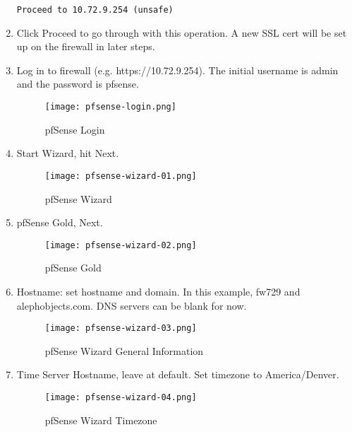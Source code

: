 \begin{enumerate}
\begin{verbatim}
Proceed to 10.72.9.254 (unsafe)
\end{verbatim}

 \item Click Proceed to go through with this operation. A new SSL cert will be set up on the firewall in later steps.

 \item Log in to firewall (e.g. https://10.72.9.254). The initial username is admin and the password is pfsense.

\begin{figure}[h!]
\begin{center}
\texttt{[image: pfsense-login.png]}
 \caption{pfSense Login}
 \label{fig:pfsense-login}
\end{center}
\end{figure}

 \item Start Wizard, hit Next.
\begin{figure}[h!]
\begin{center}
\texttt{[image: pfsense-wizard-01.png]}
 \caption{pfSense Wizard}
 \label{fig:pfsense-wizard-01}
\end{center}
\end{figure}

 \item pfSense Gold, Next.
\begin{figure}[h!]
\begin{center}
\texttt{[image: pfsense-wizard-02.png]}
 \caption{pfSense Gold}
 \label{fig:pfsense-wizard-02}
\end{center}
\end{figure}

 \item Hostname: set hostname and domain. In this example, fw729 and alephobjects.com. DNS servers can be blank for now.
\begin{figure}[h!]
\begin{center}
\texttt{[image: pfsense-wizard-03.png]}
 \caption{pfSense Wizard General Information}
 \label{fig:pfsense-wizard-03}
\end{center}
\end{figure}

 \item Time Server Hostname, leave at default. Set timezone to America/Denver.
\begin{figure}[h!]
\begin{center}
\texttt{[image: pfsense-wizard-04.png]}
 \caption{pfSense Wizard Timezone}
 \label{fig:pfsense-wizard-04}
\end{center}
\end{figure}


\end{enumerate}
